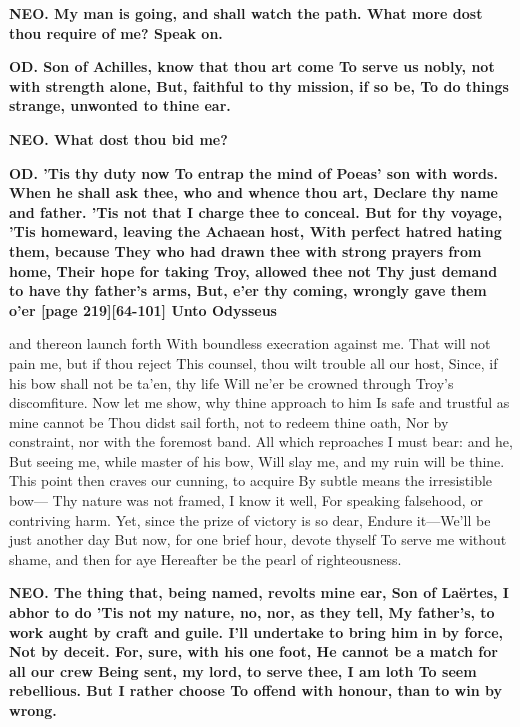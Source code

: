 \documentclass[11pt,letter]{book}
\begin{document}
\par \textbf{NEO. My man is going, and shall watch the path. What more dost thou require of me? Speak on.}
\par 

\par \textbf{OD. Son of Achilles, know that thou art come To serve us nobly, not with strength alone, But, faithful to thy mission, if so be, To do things strange, unwonted to thine ear.}
\par 

\par \textbf{NEO. What dost thou bid me?}
\par 

\par \textbf{OD. ’Tis thy duty now To entrap the mind of Poeas’ son with words. When he shall ask thee, who and whence thou art, Declare thy name and father. ’Tis not that I charge thee to conceal. But for thy voyage, ’Tis homeward, leaving the Achaean host, With perfect hatred hating them, because They who had drawn thee with strong prayers from home, Their hope for taking Troy, allowed thee not Thy just demand to have thy father’s arms, But, e’er thy coming, wrongly gave them o’er [page 219][64-101] Unto Odysseus}
\par   and thereon launch forth With boundless execration against me. That will not pain me, but if thou reject This counsel, thou wilt trouble all our host, Since, if his bow shall not be ta’en, thy life Will ne’er be crowned through Troy’s discomfiture. Now let me show, why thine approach to him Is safe and trustful as mine cannot be Thou didst sail forth, not to redeem thine oath, Nor by constraint, nor with the foremost band. All which reproaches I must bear:  and he, But seeing me, while master of his bow, Will slay me, and my ruin will be thine. This point then craves our cunning, to acquire By subtle means the irresistible bow— Thy nature was not framed, I know it well, For speaking falsehood, or contriving harm. Yet, since the prize of victory is so dear, Endure it—We’ll be just another day But now, for one brief hour, devote thyself To serve me without shame, and then for aye Hereafter be the pearl of righteousness.

\par \textbf{NEO. The thing that, being named, revolts mine ear, Son of Laërtes, I abhor to do ’Tis not my nature, no, nor, as they tell, My father’s, to work aught by craft and guile. I’ll undertake to bring him in by force, Not by deceit. For, sure, with his one foot, He cannot be a match for all our crew Being sent, my lord, to serve thee, I am loth To seem rebellious. But I rather choose To offend with honour, than to win by wrong.}
\par 
\end{document}
